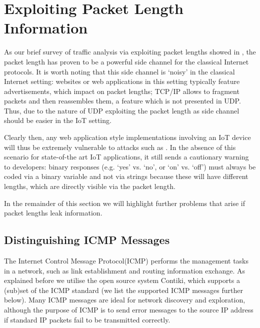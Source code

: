 \section{Exploiting Packet Length Information\label{sec: PacketLen}}

As our brief survey of traffic analysis via exploiting packet lengths showed in , the packet length has proven to be a powerful side channel for the classical Internet protocols. It is worth noting that this side channel is `noisy' in the classical Internet setting: websites or web applications in this setting typically feature advertisements, which impact on packet lengths; TCP/IP allows to fragment packets and then reassembles them, a feature which is not presented in UDP. Thus, due to the nature of UDP exploiting the packet length as side channel should be easier in the IoT setting.

Clearly then, any web application style implementations involving an IoT device will thus be extremely vulnerable to attacks such as \cite{WebSidechannel}. In the absence of this scenario for state-of-the art IoT applications, it still sends a cautionary warning to developers: binary responses (e.g. `yes' vs. `no', or `on' vs. `off') must always be coded via a binary variable and not via strings because these will have different lengths, which are directly visible via the packet length.

In the remainder of this section we will highlight further problems that arise if packet lengths leak information.

\subsection{Distinguishing ICMP Messages}
The Internet Control Message Protocol(ICMP)\cite{rfc4443} performs the management tasks in a network, such as link establishment and routing information exchange. As explained before we utilise the open source system Contiki, which supports a (sub)set of the ICMP standard (we list the supported ICMP messages further below). Many ICMP messages are ideal for network discovery and exploration, although the purpose of ICMP is to send error messages to the source IP address if standard IP packets fail to be transmitted correctly. 


